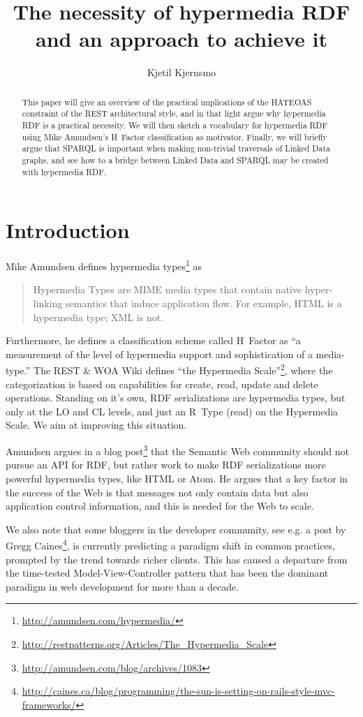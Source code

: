 \documentclass{llncs}
\title{The necessity of hypermedia RDF and an approach to achieve it}
\author{Kjetil Kjernsmo\inst{1}}
\institute{Department of Informatics,
Postboks 1080 Blindern,
0316 Oslo, Norway
\email{kjekje@ifi.uio.no}}
\begin{document}
\maketitle



\begin{abstract}
This paper will give an overview of the practical implications of the
HATEOAS constraint of the REST architectural style, and in that light argue why
hypermedia RDF is a practical necessity. We will then sketch a
vocabulary for hypermedia RDF using Mike Amundsen's H~Factor
classification as motivator. Finally, we will briefly argue that
SPARQL is important when making non-trivial traversals of Linked Data
graphs, and see how to a bridge between Linked Data and SPARQL may be
created with hypermedia RDF.
\end{abstract}

\section{Introduction}

Mike Amundsen defines hypermedia types\footnote{\url{http://amundsen.com/hypermedia/}} as 
\begin{quote}
Hypermedia Types are MIME media types that contain native
hyper-linking semantics that induce application flow. For example,
HTML is a hypermedia type; XML is not.
\end{quote}
Furthermore, he defines a classification scheme called H~Factor as ``a
measurement of the level of hypermedia support and sophistication of a
media-type.'' The REST \& WOA Wiki defines ``the Hypermedia
Scale''\footnote{\url{http://restpatterns.org/Articles/The\_Hypermedia\_Scale}},
where the categorization is based on capabilities for create, read,
update and delete operations.  Standing on it's own, RDF
serializations are hypermedia types, but only at the \textsf{LO} and
\textsf{CL} levels, and just an R~Type (read) on the Hypermedia
Scale. We aim at improving this situation.

Amundsen argues in a blog
post\footnote{\url{http://amundsen.com/blog/archives/1083}} that the
Semantic Web community should not pursue an API for RDF, but rather
work to make RDF serializations more powerful hypermedia types, like HTML or
Atom. He argues that a key factor in the success of the Web is that
messages not only contain data but also application control
information, and this is needed for the Web to scale.

We also note that some bloggers in the developer community, see
e.g. a post by Gregg
Caines\footnote{\url{http://caines.ca/blog/programming/the-sun-is-setting-on-rails-style-mvc-frameworks/}},
is currently predicting a paradigm shift in common practices, prompted
by the trend towards richer clients. This has caused a departure from
the time-tested Model-View-Controller pattern that has been the
dominant paradigm in web development for more than a decade.
\end{document}
